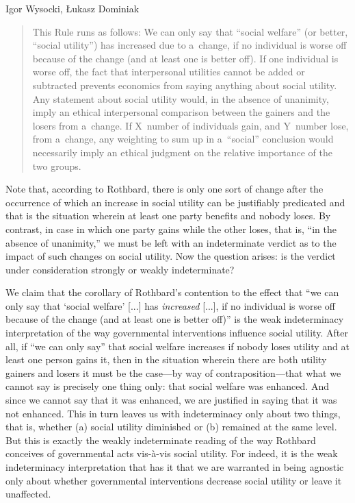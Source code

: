 \begin{artengenv}{Igor Wysocki, Łukasz Dominiak}
\begin{quote}
This Rule runs as follows: We can only say that ``social welfare'' (or better, ``social utility'') has increased due to a~change, if no individual is worse off because of the change (and at least one is better off). If one individual is worse off, the fact that interpersonal utilities cannot be added or subtracted prevents economics from saying anything about social utility. Any statement about social utility would, in the absence of unanimity, imply an ethical interpersonal comparison between the gainers and the losers from a~change. If X~number of individuals gain, and Y~number lose, from a~change, any weighting to sum up in a~``social'' conclusion would necessarily imply an ethical judgment on the relative importance of the two groups. 
\parencite[][pp.244–245]{rothbard_toward_2008}%
\end{quote}




Note that, according to Rothbard, there is only one sort of change after the occurrence of which an increase in social utility can be justifiably predicated and that is the situation wherein at least one party benefits and nobody loses. By contrast, in case in which one party gains while the other loses, that is, ``in the absence of unanimity,'' we must be left with an indeterminate verdict as to the impact of such changes on social utility. Now the question arises: is the verdict under consideration strongly or weakly indeterminate?



We claim that the corollary of Rothbard's contention to the effect that ``we can only say that ‘social welfare' [...] has \textit{increased} [...], if no individual is worse off because of the change (and at least one is better off)'' is the weak indeterminacy interpretation of the way governmental interventions influence social utility. After all, if ``we can only say'' that social welfare increases if nobody loses utility and at least one person gains it, then in the situation wherein there are both utility gainers and losers it must be the case---by way of contraposition---that what we cannot say is precisely one thing only: that social welfare was enhanced. And since we cannot say that it was enhanced, we are justified in saying that it was not enhanced. This in turn leaves us with indeterminacy only about two things, that is, whether (a) social utility diminished or (b) remained at the same level. But this is exactly the weakly indeterminate reading of the way Rothbard conceives of governmental acts vis-à-vis social utility. For indeed, it is the weak indeterminacy interpretation that has it that we are warranted in being agnostic only about whether governmental interventions decrease social utility or leave it unaffected.




\end{artengenv}

